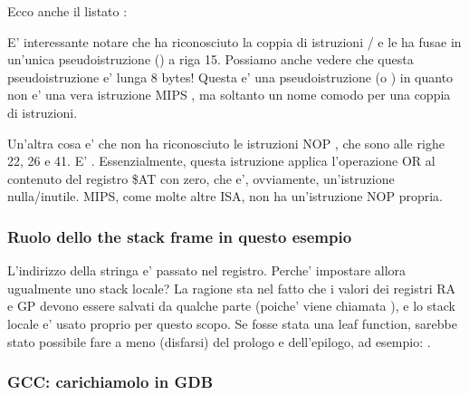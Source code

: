 Ecco anche il listato \IDA:




E' interessante notare che \IDA ha riconosciuto la coppia di istruzioni / e le ha fusae in un'unica pseudoistruzione 
 () a riga 15.
Possiamo anche vedere che questa pseudoistruzione e' lunga 8 bytes!
Questa e' una pseudoistruzione (o ) in quanto non e' una vera istruzione MIPS , ma soltanto un nome comodo per una coppia
di istruzioni.


Un'altra cosa e' che \IDA non ha riconosciuto le istruzioni \ac{NOP} , che sono alle righe 22, 26 e 41.
E' .
Essenzialmente, questa istruzione applica l'operazione OR al contenuto del registro \$AT 
con zero, che e', ovviamente, un'istruzione nulla/inutile.
MIPS, come molte altre \ac{ISA}, non ha un'istruzione \ac{NOP} propria.

\subsubsection{Ruolo dello the stack frame in questo esempio}

L'indirizzo della stringa e' passato nel registro.
Perche' impostare allora ugualmente uno stack locale?
La ragione sta nel fatto che i valori dei registri \ac{RA} e GP devono essere salvati da qualche parte 
(poiche' viene chiamata \printf ), e lo stack locale e' usato proprio per questo scopo.
Se fosse stata una \gls{leaf function}, sarebbe stato possibile fare a meno (disfarsi) del prologo e dell'epilogo,
ad esempio: .

\subsubsection{\Optimizing GCC: carichiamolo in GDB}


